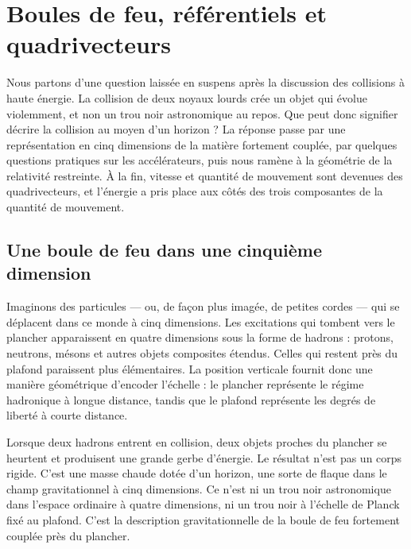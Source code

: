 \chapter{Boules de feu, référentiels et quadrivecteurs}

Nous partons d’une question laissée en suspens après la discussion des collisions à haute énergie. La collision de deux noyaux lourds crée un objet qui évolue violemment, et non un trou noir astronomique au repos. Que peut donc signifier décrire la collision au moyen d’un horizon ? La réponse passe par une représentation en cinq dimensions de la matière fortement couplée, par quelques questions pratiques sur les accélérateurs, puis nous ramène à la géométrie de la relativité restreinte. À la fin, vitesse et quantité de mouvement sont devenues des quadrivecteurs, et l’énergie a pris place aux côtés des trois composantes de la quantité de mouvement.

\section{Une boule de feu dans une cinquième dimension}

\begin{classroomqa}\end{classroomqa}

Imaginons des particules — ou, de façon plus imagée, de petites cordes — qui se déplacent dans ce monde à cinq dimensions. Les excitations qui tombent vers le plancher apparaissent en quatre dimensions sous la forme de hadrons : protons, neutrons, mésons et autres objets composites étendus. Celles qui restent près du plafond paraissent plus élémentaires. La position verticale fournit donc une manière géométrique d’encoder l’échelle : le plancher représente le régime hadronique à longue distance, tandis que le plafond représente les degrés de liberté à courte distance.

Lorsque deux hadrons entrent en collision, deux objets proches du plancher se heurtent et produisent une grande gerbe d’énergie. Le résultat n’est pas un corps rigide. C’est une masse chaude dotée d’un horizon, une sorte de flaque dans le champ gravitationnel à cinq dimensions. Ce n’est ni un trou noir astronomique dans l’espace ordinaire à quatre dimensions, ni un trou noir à l’échelle de Planck fixé au plafond. C’est la description gravitationnelle de la boule de feu fortement couplée près du plancher.

